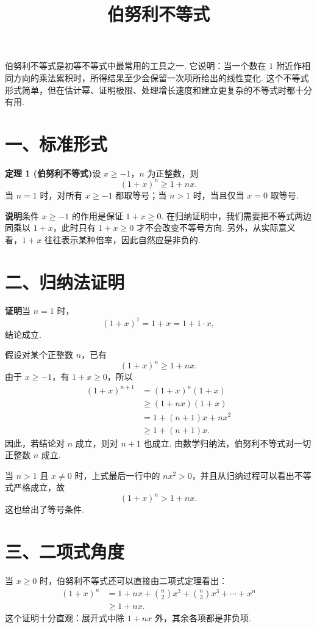\documentclass[UTF8, 12pt, fontset=fandol, oneside]{ctexart}
\title{伯努利不等式}
\author{}
\date{}
\begin{document}
\maketitle

伯努利不等式是初等不等式中最常用的工具之一. 它说明：当一个数在 $1$ 附近作相同方向的乘法累积时，所得结果至少会保留一次项所给出的线性变化. 这个不等式形式简单，但在估计幂、证明极限、处理增长速度和建立更复杂的不等式时都十分有用.

\section*{一、标准形式}

\noindent\textbf{定理 1 (伯努利不等式)}\quad 设 $x\ge -1$，$n$ 为正整数，则
\[
  (1+x)^n\ge 1+nx.
\]
当 $n=1$ 时，对所有 $x\ge -1$ 都取等号；当 $n>1$ 时，当且仅当 $x=0$ 取等号.

\noindent\textbf{说明}\quad 条件 $x\ge -1$ 的作用是保证 $1+x\ge0$. 在归纳证明中，我们需要把不等式两边同乘以 $1+x$，此时只有 $1+x\ge0$ 才不会改变不等号方向. 另外，从实际意义看，$1+x$ 往往表示某种倍率，因此自然应是非负的.

\section*{二、归纳法证明}

\noindent\textbf{证明}\quad 当 $n=1$ 时，
\[
  (1+x)^1=1+x=1+1\cdot x,
\]
结论成立.

假设对某个正整数 $n$，已有
\[
  (1+x)^n\ge 1+nx.
\]
由于 $x\ge -1$，有 $1+x\ge0$，所以
\[
\begin{aligned}
  (1+x)^{n+1}
  &= (1+x)^n(1+x)\\
  &\ge (1+nx)(1+x)\\
  &= 1+(n+1)x+nx^2\\
  &\ge 1+(n+1)x.
\end{aligned}
\]
因此，若结论对 $n$ 成立，则对 $n+1$ 也成立. 由数学归纳法，伯努利不等式对一切正整数 $n$ 成立.

当 $n>1$ 且 $x\ne0$ 时，上式最后一行中的 $nx^2>0$，并且从归纳过程可以看出不等式严格成立，故
\[
  (1+x)^n>1+nx.
\]
这也给出了等号条件.

\section*{三、二项式角度}

当 $x\ge0$ 时，伯努利不等式还可以直接由二项式定理看出：
\[
\begin{aligned}
  (1+x)^n
  &=1+nx+\binom n2x^2+\binom n3x^3+\cdots+x^n\\
  &\ge 1+nx.
\end{aligned}
\]
这个证明十分直观：展开式中除 $1+nx$ 外，其余各项都是非负项.
\end{document}
